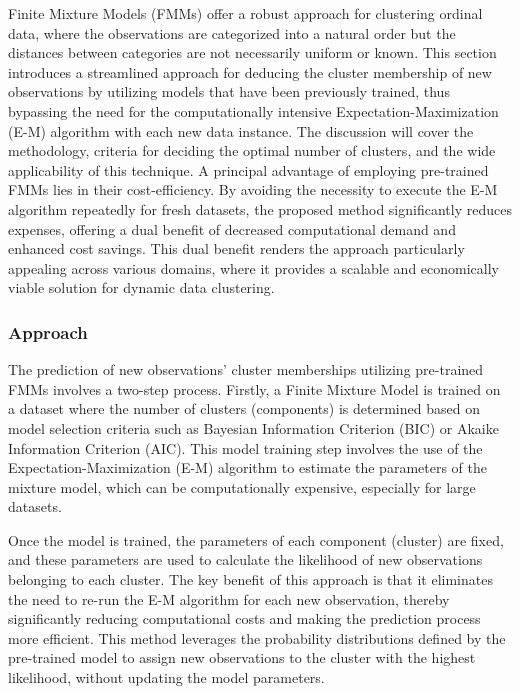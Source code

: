 \documentclass{article}
\begin{document}
Finite Mixture Models (FMMs) offer a robust approach for clustering ordinal data, where the observations are categorized into a natural order but the distances between categories are not necessarily uniform or known. 
This section introduces a streamlined approach for deducing the cluster membership of new observations by utilizing models that have been previously trained, thus bypassing the need for the computationally intensive Expectation-Maximization (E-M) algorithm with each new data instance. 
The discussion will cover the methodology, criteria for deciding the optimal number of clusters, and the wide applicability of this technique. A principal advantage of employing pre-trained FMMs lies in their cost-efficiency. By avoiding the necessity to execute the E-M algorithm repeatedly for fresh datasets, the proposed method significantly reduces expenses, offering a dual benefit of decreased computational demand and enhanced cost savings. This dual benefit renders the approach particularly appealing across various domains, where it provides a scalable and economically viable solution for dynamic data clustering.

\subsubsection*{Approach}

The prediction of new observations' cluster memberships utilizing pre-trained FMMs involves a two-step process. Firstly, a Finite Mixture Model is trained on a dataset where the number of clusters (components) is determined based on model selection criteria such as Bayesian Information Criterion (BIC) or Akaike Information Criterion (AIC). This model training step involves the use of the Expectation-Maximization (E-M) algorithm to estimate the parameters of the mixture model, which can be computationally expensive, especially for large datasets.

Once the model is trained, the parameters of each component (cluster) are fixed, and these parameters are used to calculate the likelihood of new observations belonging to each cluster. The key benefit of this approach is that it eliminates the need to re-run the E-M algorithm for each new observation, thereby significantly reducing computational costs and making the prediction process more efficient. This method leverages the probability distributions defined by the pre-trained model to assign new observations to the cluster with the highest likelihood, without updating the model parameters.
\end{document}
